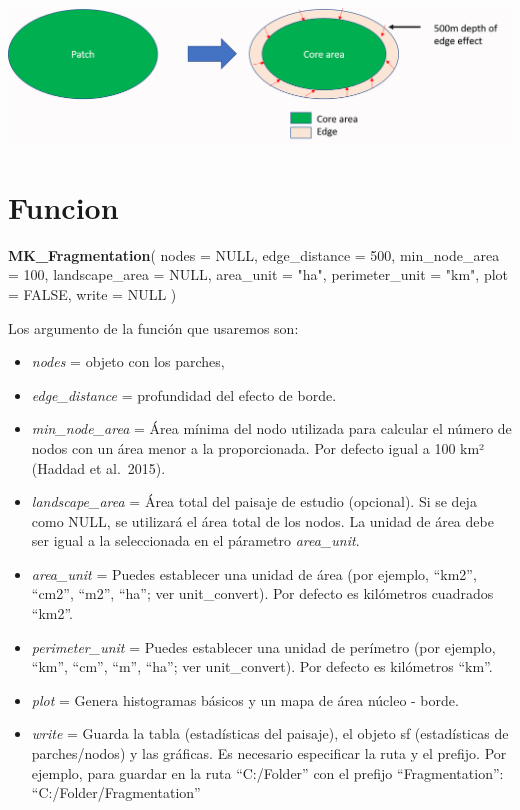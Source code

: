 \documentclass[
]{book}
\newenvironment{Shaded}{\begin{snugshade}}{\end{snugshade}}
\newcommand{\AttributeTok}[1]{\textcolor[rgb]{0.13,0.29,0.53}{#1}}
\newcommand{\ConstantTok}[1]{\textcolor[rgb]{0.56,0.35,0.01}{#1}}
\newcommand{\DecValTok}[1]{\textcolor[rgb]{0.00,0.00,0.81}{#1}}
\newcommand{\FunctionTok}[1]{\textcolor[rgb]{0.13,0.29,0.53}{\textbf{#1}}}
\newcommand{\NormalTok}[1]{#1}
\newcommand{\StringTok}[1]{\textcolor[rgb]{0.31,0.60,0.02}{#1}}
\providecommand{\tightlist}{%
  \setlength{\itemsep}{0pt}\setlength{\parskip}{0pt}}
\begin{document}
\includegraphics[width=5.23958in,height=\textheight,keepaspectratio]{Imagen1.png}

\section{Funcion}\label{funcion}

\begin{Shaded}
\begin{Highlighting}[]
\FunctionTok{MK\_Fragmentation}\NormalTok{(}
  \AttributeTok{nodes =} \ConstantTok{NULL}\NormalTok{,}
  \AttributeTok{edge\_distance =} \DecValTok{500}\NormalTok{,}
  \AttributeTok{min\_node\_area =} \DecValTok{100}\NormalTok{,}
  \AttributeTok{landscape\_area =} \ConstantTok{NULL}\NormalTok{,}
  \AttributeTok{area\_unit =} \StringTok{"ha"}\NormalTok{,}
  \AttributeTok{perimeter\_unit =} \StringTok{"km"}\NormalTok{,}
  \AttributeTok{plot =} \ConstantTok{FALSE}\NormalTok{,}
  \AttributeTok{write =} \ConstantTok{NULL}
\NormalTok{)}
\end{Highlighting}
\end{Shaded}

Los argumento de la función que usaremos son:

\begin{itemize}
\tightlist
\item
  \emph{nodes} = objeto con los parches,
\item
  \emph{edge\_distance} = profundidad del efecto de borde.
\item
  \emph{min\_node\_area} = Área mínima del nodo utilizada para calcular el número de nodos con un área menor a la proporcionada. Por defecto igual a 100 km² (Haddad et al.~2015).
\item
  \emph{landscape\_area} = Área total del paisaje de estudio (opcional). Si se deja como NULL, se utilizará el área total de los nodos. La unidad de área debe ser igual a la seleccionada en el párametro \emph{area\_unit}.
\item
  \emph{area\_unit} = Puedes establecer una unidad de área (por ejemplo, ``km2'', ``cm2'', ``m2'', ``ha''; ver unit\_convert). Por defecto es kilómetros cuadrados ``km2''.
\item
  \emph{perimeter\_unit} = Puedes establecer una unidad de perímetro (por ejemplo, ``km'', ``cm'', ``m'', ``ha''; ver unit\_convert). Por defecto es kilómetros ``km''.
\item
  \emph{plot} = Genera histogramas básicos y un mapa de área núcleo - borde.
\item
  \emph{write} = Guarda la tabla (estadísticas del paisaje), el objeto sf (estadísticas de parches/nodos) y las gráficas. Es necesario especificar la ruta y el prefijo. Por ejemplo, para guardar en la ruta ``C:/Folder'' con el prefijo ``Fragmentation'': ``C:/Folder/Fragmentation''
\end{itemize}
\end{document}
